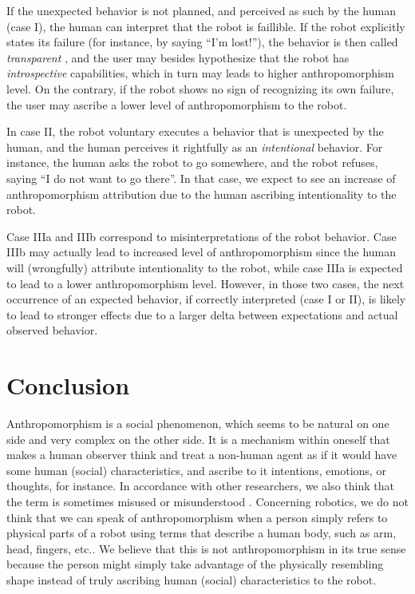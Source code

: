 \documentclass[lettersize, apacite, twoside, HRI]{apa_HRI}
\begin{document}
If the unexpected behavior is not planned, and perceived as such by the human
(case I), the human can interpret that the robot is faillible. If the robot
explicitly states its failure (for instance, by saying ``I'm lost!''), the
behavior is then called \emph{transparent} , and the
user may besides hypothesize that the robot has \emph{introspective}
capabilities, which in turn may leads to higher anthropomorphism level.  On the
contrary, if the robot shows no sign of recognizing its own failure, the user
may ascribe a lower level of anthropomorphism to the robot.

In case II, the robot voluntary executes a behavior that is unexpected by the
human, and the human perceives it rightfully as an \emph{intentional} behavior.
For instance, the human asks the robot to go somewhere, and the robot refuses,
saying ``I do not want to go there''. In that case, we expect to see an
increase of anthropomorphism attribution due to the human ascribing
intentionality to the robot.

Case IIIa and IIIb correspond to misinterpretations of the robot behavior. Case
IIIb may actually lead to increased level of anthropomorphism since the human
will (wrongfully) attribute intentionality to the robot, while case IIIa is
expected to lead to a lower anthropomorphism level.  However, in those two
cases, the next occurrence of an expected behavior, if correctly interpreted
(case I or II), is likely to lead to stronger effects due to a larger delta
between expectations and actual observed behavior.




%
%
%
%
%
%


\section{Conclusion}
\label{sec:9}


	Anthropomorphism is a social phenomenon, which seems to be natural on one side and very complex on the other side. It is a mechanism within oneself that makes a human observer think and treat a non-human agent as if it would have some human (social) characteristics, and ascribe to it intentions, emotions, or thoughts, for instance. In accordance with other researchers, we also think that the term is sometimes misused or misunderstood \cite{duffy_anthropomorphism_2002}. Concerning robotics, we do not think that we can speak of anthropomorphism when a person simply refers to physical parts of a robot using terms that describe a human body, such as arm, head, fingers, etc.. We believe that this is not anthropomorphism in its true sense because the person might simply take advantage of the physically resembling shape instead of truly ascribing human (social) characteristics to the robot.
\end{document}
